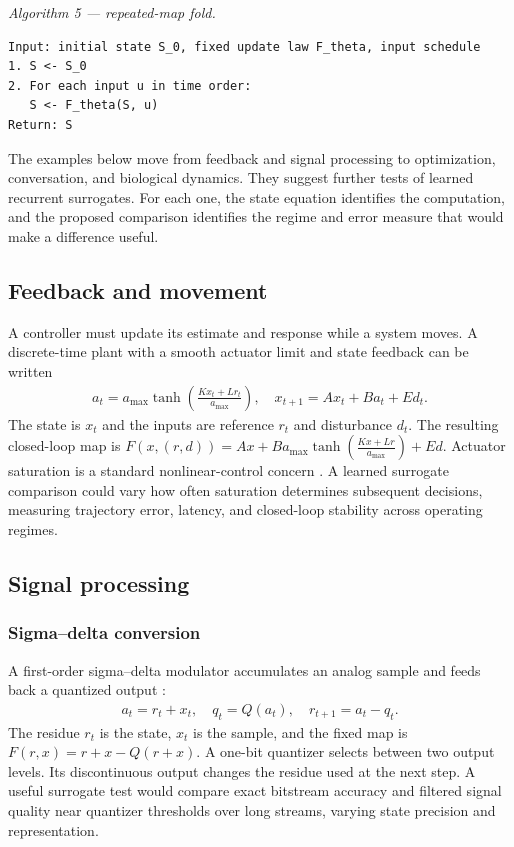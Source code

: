 \documentclass[10pt]{article}
\theoremstyle{canonical}
\theoremstyle{canonicalbullet}
\begin{document}
\emph{Algorithm 5 --- repeated-map fold.}
\begin{verbatim}
Input: initial state S_0, fixed update law F_theta, input schedule
1. S <- S_0
2. For each input u in time order:
   S <- F_theta(S, u)
Return: S
\end{verbatim}


The examples below move from feedback and signal processing to optimization, conversation, and biological dynamics. They suggest further tests of learned recurrent surrogates. For each one, the state equation identifies the computation, and the proposed comparison identifies the regime and error measure that would make a difference useful.


\subsection*{Feedback and movement}


A controller must update its estimate and response while a system moves. A discrete-time plant with a smooth actuator limit and state feedback can be written
\[\begin{aligned}{a }_{t } =  {a }_{\operatorname{max}} \operatorname{tanh}( \frac{K  {x }_{t } +  L  {r }_{t }}{{a }_{\operatorname{max}}}) ,  \quad  {x }_{t + 1} =  A  {x }_{t } +  B  {a }_{t } +  E  {d }_{t }. \end{aligned}\]
 The state is ${x }_{t }$ and the inputs are reference ${r }_{t }$ and disturbance ${d }_{t }$. The resulting closed-loop map is $F ( x , ( r , d ) ) = A  x + B  {a }_{\operatorname{max}} \operatorname{tanh}( \frac{K  x + L  r }{{a }_{\operatorname{max}}}) + E  d $. Actuator saturation is a standard nonlinear-control concern \citep{khalil2002}. A learned surrogate comparison could vary how often saturation determines subsequent decisions, measuring trajectory error, latency, and closed-loop stability across operating regimes.


\subsection*{Signal processing}



\subsubsection*{Sigma--delta conversion}


A first-order sigma--delta modulator accumulates an analog sample and feeds back a quantized output \citep{candy_temes1992}:
\[\begin{aligned}{a }_{t } =  {r }_{t } +  {x }_{t },  \quad  {q }_{t } =  Q ( {a }_{t }) ,  \quad  {r }_{t + 1} =  {a }_{t } -  {q }_{t }. \end{aligned}\]
 The residue ${r }_{t }$ is the state, ${x }_{t }$ is the sample, and the fixed map is $F ( r , x ) = r + x - Q ( r + x ) $. A one-bit quantizer selects between two output levels. Its discontinuous output changes the residue used at the next step. A useful surrogate test would compare exact bitstream accuracy and filtered signal quality near quantizer thresholds over long streams, varying state precision and representation.
\end{document}
